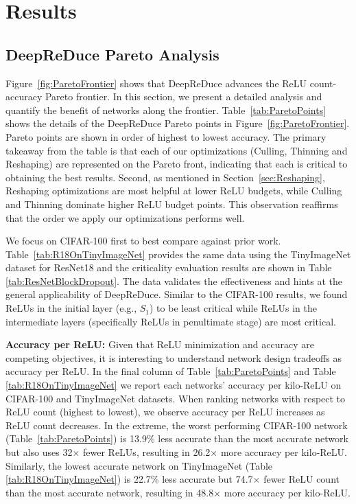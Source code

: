 

\section{Results}  \label{sec:ExperimentalResults}



\subsection{DeepReDuce Pareto Analysis}
Figure~\ref{fig:ParetoFrontier} shows that 
DeepReDuce advances the ReLU count-accuracy Pareto frontier.
In this section, we present a detailed analysis and
quantify the benefit of networks along the frontier.
Table~\ref{tab:ParetoPoints} shows the details of the 
DeepReDuce Pareto points in Figure~\ref{fig:ParetoFrontier}.
Pareto points are shown in order of highest to lowest accuracy.
The primary takeaway from the table is that each of our optimizations (Culling, Thinning and Reshaping) are represented on the Pareto front, indicating that each is critical to obtaining the best results. 
Second, as mentioned in Section~\ref{sec:Reshaping}, Reshaping optimizations are most helpful at lower ReLU budgets, while Culling and Thinning dominate higher ReLU budget points.
This observation reaffirms that the order we apply our optimizations performs well.

We focus on CIFAR-100 first to best compare against prior work. Table~\ref{tab:R18OnTinyImageNet} provides the same data using the TinyImageNet dataset for ResNet18 and the criticality evaluation results are shown in Table \ref{tab:ResNetBlockDropout}. The data validates the effectiveness and hints at the general applicability of DeepReDuce.
Similar to the CIFAR-100 results, we found ReLUs in the initial layer 
(e.g., $S_1$) to be least critical while ReLUs in the intermediate layers (specifically ReLUs in penultimate stage) are most critical.


{\bf Accuracy per ReLU:}
Given that ReLU minimization and accuracy are competing objectives,
it is interesting to understand network design tradeoffs as accuracy per ReLU.
In the final column of Table~\ref{tab:ParetoPoints} and Table \ref{tab:R18OnTinyImageNet} 
we report each networks' accuracy per kilo-ReLU on CIFAR-100 and TinyImageNet datasets.
When ranking networks with respect to ReLU count (highest to lowest),
we observe accuracy per ReLU increases as ReLU count decreases.
In the extreme, the worst performing  CIFAR-100 network (Table~\ref{tab:ParetoPoints}) is 13.9\% less accurate than the most accurate network but also uses 32$\times$ fewer ReLUs, resulting in 26.2$\times$ more accuracy per kilo-ReLU. 
Similarly, the lowest accurate network on TinyImageNet (Table \ref{tab:R18OnTinyImageNet}) is 22.7\% less accurate but 74.7$\times$ fewer ReLU count than the most accurate network, resulting in 48.8$\times$ more accuracy per kilo-ReLU.

